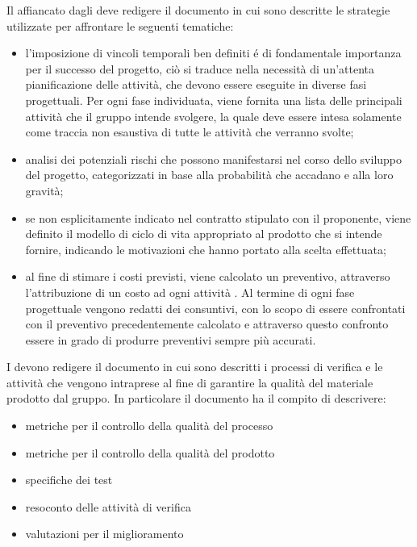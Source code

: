 Il \responsabile{} affiancato dagli \amministratori{} deve redigere il documento \PdPv{} in cui sono descritte le strategie utilizzate per affrontare le seguenti tematiche:

\begin{itemize}
    \item l'imposizione di vincoli temporali ben definiti \'{e} di fondamentale importanza per il successo del progetto, ci\`{o} si traduce nella necessit\`{a} di un'attenta pianificazione delle attivit\`{a}, che devono essere eseguite in diverse fasi progettuali. Per ogni fase individuata, viene fornita una lista delle principali attivit\`{a} che il gruppo intende svolgere, la quale deve essere intesa solamente come traccia non esaustiva di tutte le attivit\`{a} che verranno svolte;
    \item analisi dei potenziali rischi che possono manifestarsi nel corso dello sviluppo del progetto, categorizzati in base alla probabilit\`{a} che accadano e alla loro gravit\`{a};
    \item se non esplicitamente indicato nel contratto stipulato con il proponente, viene definito il modello di ciclo di vita appropriato al prodotto che si intende fornire, indicando le motivazioni che hanno portato alla scelta effettuata;
    \item al fine di stimare i costi previsti, viene calcolato un preventivo, attraverso l'attribuzione di un costo ad ogni attivit\`{a} . Al termine di ogni fase progettuale vengono redatti dei consuntivi, con lo scopo di essere confrontati con il preventivo precedentemente calcolato e attraverso questo confronto essere in grado di produrre preventivi sempre pi\`{u} accurati.
\end{itemize}

I \verificatori{} devono redigere il documento \PdQv{} in cui sono descritti i processi di verifica e le attivit\`{a} che vengono intraprese al fine di garantire la qualit\`{a} del materiale prodotto dal gruppo. In particolare il documento ha il compito di descrivere:

\begin{itemize}
    \item metriche per il controllo della qualit\`{a} del processo
    \item metriche per il controllo della qualit\`{a} del prodotto
    \item specifiche dei test
    \item resoconto delle attivit\`{a} di verifica
    \item valutazioni per il miglioramento
\end{itemize}
